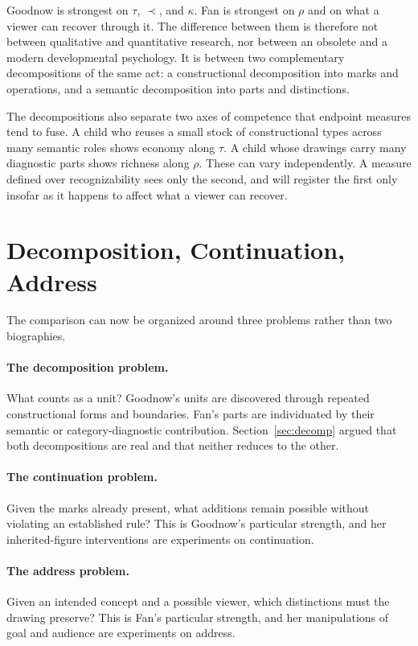 \documentclass[11pt]{article}
\theoremstyle{remark}
\begin{document}
Goodnow is strongest on $\tau$, $\prec$, and $\kappa$. Fan is strongest on $\rho$ and on what a viewer can recover through it. The difference between them is therefore not between qualitative and quantitative research, nor between an obsolete and a modern developmental psychology. It is between two complementary decompositions of the same act: a constructional decomposition into marks and operations, and a semantic decomposition into parts and distinctions.

The decompositions also separate two axes of competence that endpoint measures tend to fuse. A child who reuses a small stock of constructional types across many semantic roles shows economy along $\tau$. A child whose drawings carry many diagnostic parts shows richness along $\rho$. These can vary independently. A measure defined over recognizability sees only the second, and will register the first only insofar as it happens to affect what a viewer can recover.

\section{Decomposition, Continuation, Address}
\label{sec:problems}

The comparison can now be organized around three problems rather than two biographies.

\paragraph{The decomposition problem.} What counts as a unit? Goodnow's units are discovered through repeated constructional forms and boundaries. Fan's parts are individuated by their semantic or category-diagnostic contribution. Section~\ref{sec:decomp} argued that both decompositions are real and that neither reduces to the other.

\paragraph{The continuation problem.} Given the marks already present, what additions remain possible without violating an established rule? This is Goodnow's particular strength, and her inherited-figure interventions are experiments on continuation.

\paragraph{The address problem.} Given an intended concept and a possible viewer, which distinctions must the drawing preserve? This is Fan's particular strength, and her manipulations of goal and audience are experiments on address.
\end{document}
